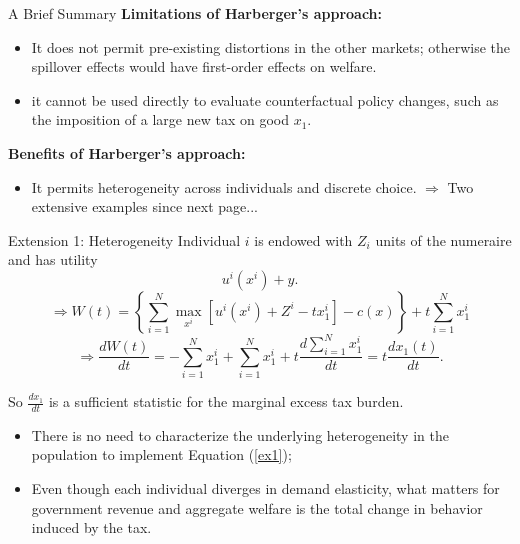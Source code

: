 \documentclass{beamer}
\begin{document}
\begin{frame}{A Brief Summary}
	\textbf{Limitations of Harberger's approach:}
	\begin{itemize}
		\item It does not permit pre-existing distortions in the other markets; otherwise the spillover effects would have first-order effects on welfare.
		\item it cannot be used directly to evaluate counterfactual policy changes, such as the imposition of a large new tax on good $x_1$.
	\end{itemize}
	\medskip

	\textbf{Benefits of Harberger’s approach:}
	\begin{itemize}
		\item It permits heterogeneity across individuals and discrete choice. $\Rightarrow$ Two extensive examples since next page...
	\end{itemize}
\end{frame}
\begin{frame}{Extension 1: Heterogeneity}
	Individual $i$ is endowed with $Z_i$ units of the numeraire and has utility
	\begin{equation}
		u^i(x^i) + y.
	\end{equation}
	\begin{equation}
		\Rightarrow W(t) = \left\{\sum_{i=1}^N\max_{x^i}\left[u^i(x^i)+Z^i-tx_1^i\right]-c(x) \right\} + t\sum_{i=1}^Nx_1^i
	\end{equation}
	\begin{equation}\label{ex1}
		\Rightarrow \frac{dW(t)}{dt} = -\sum_{i=1}^N x_1^i + \sum_{i=1}^N x_1^i + t\frac{d\sum_{i=1}^Nx_1^i}{dt} = t\frac{dx_1(t)}{dt}.
	\end{equation}

	So $\frac{dx_1}{dt}$ is a sufficient statistic for the marginal excess tax burden.
	\begin{itemize}
		\item There is no need to characterize the underlying heterogeneity in the population to implement Equation (\ref{ex1});
		\item Even though each individual diverges in demand elasticity, what matters for government revenue and aggregate welfare is the total change in behavior induced by the tax.
	\end{itemize}
\end{frame}
\end{document}
